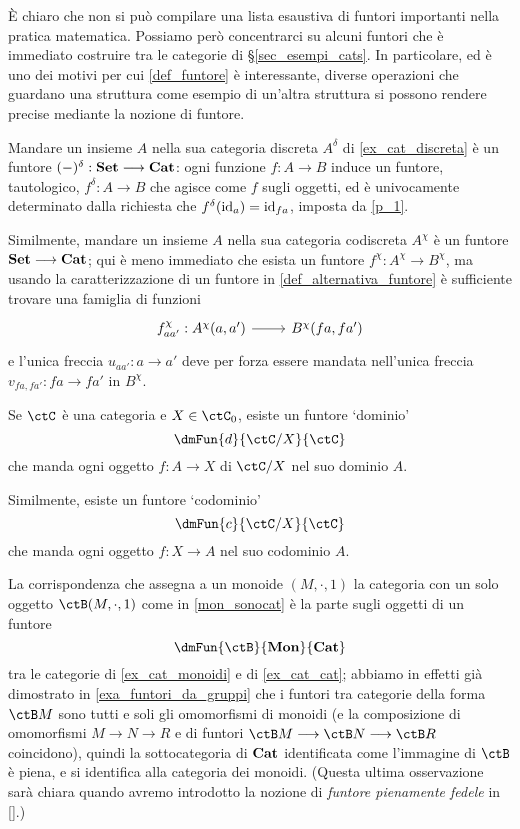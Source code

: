 \`E chiaro che non si può compilare una lista esaustiva di funtori importanti nella pratica matematica. Possiamo però concentrarci su alcuni funtori che è immediato costruire tra le categorie di §\ref{sec_esempi_cats}. In particolare, ed è uno dei motivi per cui \ref{def_funtore} è interessante, diverse operazioni che guardano una struttura come esempio di un'altra struttura si possono rendere precise mediante la nozione di funtore.
\begin{example}
	Mandare un insieme \(A\) nella sua categoria discreta \(A^\delta\) di \ref{ex_cat_discreta} è un funtore \((-)^\delta : \mathbf{Set} \longrightarrow \mathbf{Cat}\): ogni funzione \(f : A \to B\) induce un funtore, tautologico, \(f^\delta : A \to B\) che agisce come \(f\) sugli oggetti, ed è univocamente determinato dalla richiesta che \(f^\delta(\mathrm{id}_a) = \mathrm{id}_{fa}\), imposta da \ref{p_1}.

	Similmente, mandare un insieme \(A\) nella sua categoria codiscreta \(A^\chi\) è un funtore \(\mathbf{Set} \longrightarrow\mathbf{Cat}\); qui è meno immediato che esista un funtore \(f^\chi : A^\chi\to B^\chi\), ma usando la caratterizzazione di un funtore in \ref{def_alternativa_funtore} è sufficiente trovare una famiglia di funzioni
	\[\begin{tikzcd}
			f^\chi_{aa'} : \Hom{A^\chi}(a,a') \ar[r] & \Hom{B^\chi}(fa, fa')
		\end{tikzcd}\]
	e l'unica freccia \(u_{aa'} : a\to a'\) deve per forza essere mandata nell'unica freccia \(v_{fa,fa'} : fa \to fa'\) in \(B^\chi\).
\end{example}
\begin{example}
	Se \(\ctC\) è una categoria e \(X\in\ctC_0\), esiste un funtore `dominio'
	\[\dmFun{d}{\ctC/X}{\ctC}\]
	che manda ogni oggetto \(f : A\to X\) di \(\ctC/X\) nel suo dominio \(A\).

	Similmente, esiste un funtore `codominio'
	\[\dmFun{c}{\ctC/X}{\ctC}\]
	che manda ogni oggetto \(f : X\to A\) nel suo codominio \(A\).
\end{example}
\begin{example}
	La corrispondenza che assegna a un monoide \((M,\cdot,1)\) la categoria con un solo oggetto \(\ctB(M,\cdot,1)\) come in \ref{mon_sonocat} è la parte sugli oggetti di un funtore
	\[\dmFun{\ctB}{\ctMon}{\ctCat}\]
	tra le categorie di \ref{ex_cat_monoidi} e di \ref{ex_cat_cat}; abbiamo in effetti già dimostrato in \ref{exa_funtori_da_gruppi} che i funtori tra categorie della forma \(\ctB M\) sono tutti e soli gli omomorfismi di monoidi (e la composizione di omomorfismi \(M\to N\to R\) e di funtori \(\ctB M \fun\ctB N \fun\ctB R\) coincidono), quindi la sottocategoria di \(\mathbf{Cat}\) identificata come l'immagine di \(\ctB\) è piena, e si identifica alla categoria dei monoidi. (Questa ultima osservazione sarà chiara quando avremo introdotto la nozione di \emph{funtore pienamente fedele} in \ref{}.)
\end{example}

